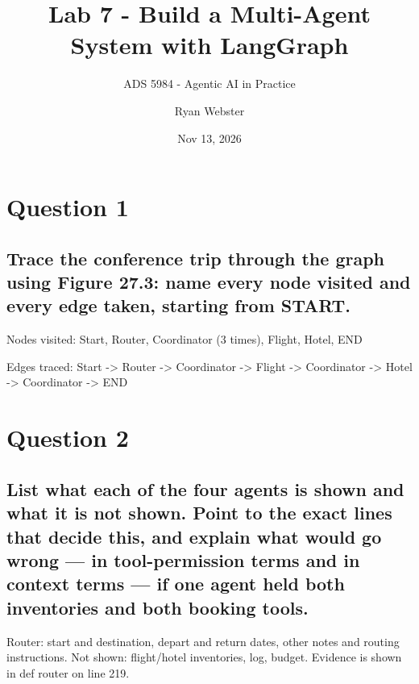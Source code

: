 \documentclass[
  11pt,
  letterpaper,
  DIV=11,
  numbers=noendperiod]{scrartcl}
\title{Lab 7 - Build a Multi-Agent System with LangGraph}
\subtitle{ADS 5984 - Agentic AI in Practice}
\author{Ryan Webster}
\date{Nov 13, 2026}
\renewcommand*\contentsname{Table of contents}
\newcommand\contentsname{Table of contents}
\begin{document}
\maketitle

\renewcommand*\contentsname{Table of contents}
{
\hypersetup{linkcolor=}
\setcounter{tocdepth}{3}
\tableofcontents
}

\section{Question 1}\label{question-1}

\subsection{Trace the conference trip through the graph using Figure
27.3: name every node visited and every edge taken, starting from
START.}\label{trace-the-conference-trip-through-the-graph-using-figure-27.3-name-every-node-visited-and-every-edge-taken-starting-from-start.}

Nodes visited: Start, Router, Coordinator (3 times), Flight, Hotel, END

Edges traced: Start -\textgreater{} Router -\textgreater{} Coordinator
-\textgreater{} Flight -\textgreater{} Coordinator -\textgreater{} Hotel
-\textgreater{} Coordinator -\textgreater{} END

\section{Question 2}\label{question-2}

\subsection{List what each of the four agents is shown and what it is
not shown. Point to the exact lines that decide this, and explain what
would go wrong --- in tool-permission terms and in context terms --- if
one agent held both inventories and both booking
tools.}\label{list-what-each-of-the-four-agents-is-shown-and-what-it-is-not-shown.-point-to-the-exact-lines-that-decide-this-and-explain-what-would-go-wrong-in-tool-permission-terms-and-in-context-terms-if-one-agent-held-both-inventories-and-both-booking-tools.}

Router: start and destination, depart and return dates, other notes and
routing instructions. Not shown: flight/hotel inventories, log, budget.
Evidence is shown in def router on line 219.
\end{document}
